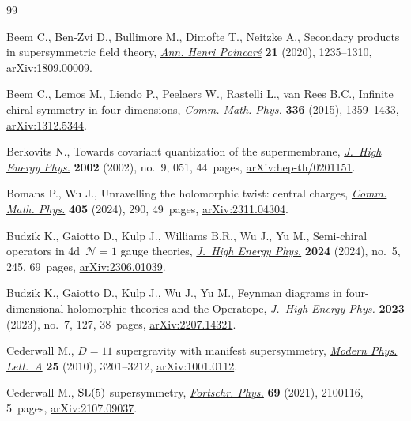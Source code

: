\documentclass[10pt,a4paper]{amsart}
\numberwithin{equation}{section}
\theoremstyle{definition}
\begin{document}
\begin{thebibliography}{99}
\footnotesize\itemsep=0pt

Beem C., Ben-Zvi D., Bullimore M., Dimofte T., Neitzke A., Secondary products
 in supersymmetric field theory,
 \href{https://doi.org/10.1007/s00023-020-00888-3}{\textit{Ann. Henri
 Poincar\'e}} \textbf{21} (2020), 1235--1310,
 \href{http://arxiv.org/abs/1809.00009}{arXiv:1809.00009}.

Beem C., Lemos M., Liendo P., Peelaers W., Rastelli L., van Rees B.C., Infinite
 chiral symmetry in four dimensions,
 \href{https://doi.org/10.1007/s00220-014-2272-x}{\textit{Comm. Math. Phys.}}
 \textbf{336} (2015), 1359--1433,
 \href{http://arxiv.org/abs/1312.5344}{arXiv:1312.5344}.

Berkovits N., Towards covariant quantization of the supermembrane,
 \href{https://doi.org/10.1088/1126-6708/2002/09/051}{\textit{J.~High Energy
 Phys.}} \textbf{2002} (2002), no.~9, 051, 44~pages,
 \href{http://arxiv.org/abs/hep-th/0201151}{arXiv:hep-th/0201151}.

Bomans P., Wu J., Unravelling the holomorphic twist: central charges,
 \href{https://doi.org/10.1007/s00220-024-05167-4}{\textit{Comm. Math. Phys.}}
 \textbf{405} (2024), 290, 49~pages,
 \href{http://arxiv.org/abs/2311.04304}{arXiv:2311.04304}.

Budzik K., Gaiotto D., Kulp J., Williams B.R., Wu J., Yu M., Semi-chiral
 operators in 4d~{$\mathcal{N} = 1$} gauge theories,
 \href{https://doi.org/10.1007/jhep05(2024)245}{\textit{J.~High Energy Phys.}}
 \textbf{2024} (2024), no.~5, 245, 69~pages,
 \href{http://arxiv.org/abs/2306.01039}{arXiv:2306.01039}.

Budzik K., Gaiotto D., Kulp J., Wu J., Yu M., Feynman diagrams in
 four-dimensional holomorphic theories and the {O}peratope,
 \href{https://doi.org/10.1007/jhep07(2023)127}{\textit{J.~High Energy Phys.}}
 \textbf{2023} (2023), no.~7, 127, 38~pages,
 \href{http://arxiv.org/abs/2207.14321}{arXiv:2207.14321}.

Cederwall M., {$D=11$} supergravity with manifest supersymmetry,
 \href{https://doi.org/10.1142/S0217732310034407}{\textit{Modern Phys.
 Lett.~A}} \textbf{25} (2010), 3201--3212,
 \href{http://arxiv.org/abs/1001.0112}{arXiv:1001.0112}.

Cederwall M., {${\rm SL}(5)$} supersymmetry,
 \href{https://doi.org/10.1002/prop.202100116}{\textit{Fortschr. Phys.}}
 \textbf{69} (2021), 2100116, 5~pages,
 \href{http://arxiv.org/abs/2107.09037}{arXiv:2107.09037}.


\end{thebibliography}
\end{document}
